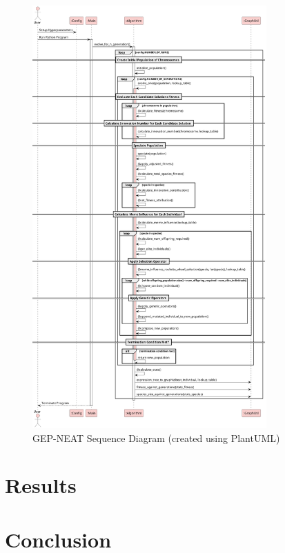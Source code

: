 \begin{figure}[H] %
	\centering %
	\includegraphics[width=0.80\textwidth]{PlantUml/sequence_diagram.png} %
	\caption{GEP-NEAT Sequence Diagram (created using PlantUML)}
	\label{fig:proto_sequence_diagram} %
\end{figure}

\section{Results}\label{sec:proto_results}

\section{Conclusion}\label{sec:proto_conclusion}
